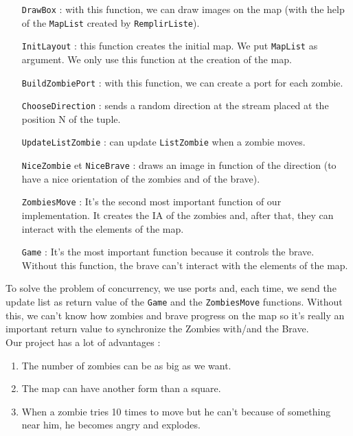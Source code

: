 \begin{itemize}
\item[\texttt{DrawBox} :] with this function, we can draw images on the map (with the help of the \texttt{MapList} created by \texttt{RemplirListe}).
\\

\item[\texttt{InitLayout} :] this function creates the initial map. We put \texttt{MapList} as argument. We only use this function at the creation of the map.
\\

\item[\texttt{BuildZombiePort} :] with this function, we can create a port for each zombie.
\\

\item[\texttt{ChooseDirection} :] sends a random direction at the stream placed at the position N of the tuple.
\\

\item[\texttt{UpdateListZombie} :] can update \texttt{ListZombie} when a zombie moves.
\\

\item[\texttt{NiceZombie} et \texttt{NiceBrave} :] draws an image in function of the direction (to have a nice orientation of the zombies and of the brave).
\\

\item[\texttt{ZombiesMove} :] It's the second most important function of our implementation. It creates the IA of the zombies and, after that, they can interact with the elements of the map.
\\

\item[\texttt{Game} :] It's the most important function because it controls the brave. Without this function, the brave can't interact with the elements of the map.
\\

\end{itemize}
To solve the problem of concurrency, we use ports and, each time, we send the update list as return value of the \texttt{Game} and the \texttt{ZombiesMove} functions. Without this, we can't know how zombies and brave progress on the map so it's really an important return value to synchronize the Zombies with/and the Brave.\\

Our project has a lot of advantages :
\begin{enumerate}
\item The number of zombies can be as big as we want.
\\

\item The map can have another form than a square.
\\

\item When a zombie tries 10 times to move but he can't because of something near him, he becomes angry and explodes.
\end{enumerate}

